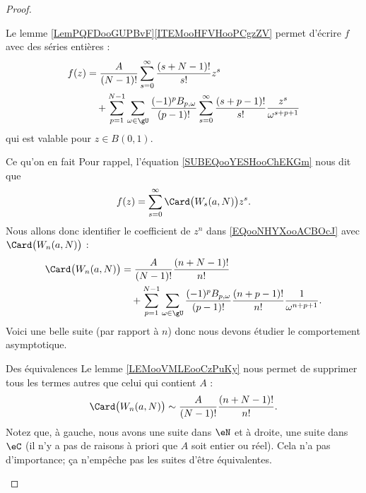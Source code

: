 \begin{proof}
\begin{subproof}
		Le lemme \ref{LemPQFDooGUPBvF}\ref{ITEMooHFVHooPCgzZV} permet d'écrire \( f\) avec des séries entières :
		\begin{equation}        \label{EQooNHYXooACBOcJ}
			\begin{aligned}[]
				f(z) & =  \frac{A}{ (N-1)! }\sum_{s=0}^{\infty}\frac{ (s+N-1)! }{ s! }z^s                                                                                    \\
				     & \quad+\sum_{p=1}^{N-1}\sum_{\omega\in \gU}\frac{(-1)^pB_{p,\omega}}{ (p-1)! }\sum_{s=0}^{\infty}\frac{ (s+p-1)! }{ s! }\frac{ z^s }{ \omega^{s+p+1} }
			\end{aligned}
		\end{equation}
		qui est valable pour \( z\in B(0,1)\).

		\item[Ce qu'on en fait]
		Pour rappel, l'équation \eqref{SUBEQooYESHooChEKGm} nous dit que
		\begin{equation}
			f(z)=\sum_{s=0}^{\infty}\Card\big( W_s(a,N) \big)z^s.
		\end{equation}
		Nous allons donc identifier le coefficient de \( z^n\) dans \eqref{EQooNHYXooACBOcJ} avec \( \Card\big( W_n(a,N) \big)\) :
		\begin{equation}
			\begin{aligned}[]
				\Card\big( W_n(a,N) \big) & =\frac{ A }{ (N-1)! }\frac{ (n+N-1)! }{ n! }                                                                                        \\
				                          & \quad+\sum_{p=1}^{N-1}\sum_{\omega\in \gU}\frac{ (-1)^{p}B_{p,\omega} }{ (p-1)! }\frac{ (n+p-1)! }{ n! }\frac{1}{ \omega^{n+p+1} }.
			\end{aligned}
		\end{equation}
		Voici une belle suite (par rapport à \( n\)) donc nous devons étudier le comportement asymptotique.
		\item[Des équivalences]
		Le lemme \ref{LEMooVMLEooCzPuKy} nous permet de supprimer tous les termes autres que celui qui contient \( A\) :
		\begin{equation}
			\Card\big( W_n(a,N) \big)\sim\frac{ A }{ (N-1)! }\frac{ (n+N-1)! }{ n! }.
		\end{equation}
		Notez que, à gauche, nous avons une suite dans \( \eN\) et à droite, une suite dans \( \eC\) (il n'y a pas de raisons à priori que \( A\) soit entier ou réel). Cela n'a pas d'importance; ça n'empêche pas les suites d'être équivalentes.


\end{subproof}
\end{proof}
